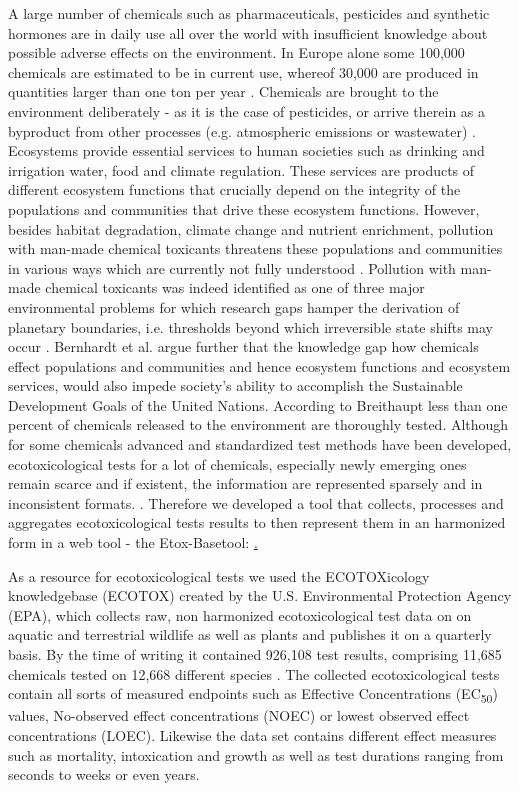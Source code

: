 \documentclass[english]{article}
\newcommand{\etoxbase}{Etox-Base}
\newcommand{\ecfifty}{EC\textsubscript{50}}
\begin{document}
A large number of chemicals such as pharmaceuticals, pesticides and synthetic hormones are in daily use all over the world with insufficient knowledge about possible adverse effects on the environment. In Europe alone some 100,000 chemicals are estimated to be in current use, whereof 30,000 are produced in quantities larger than one ton per year \citep{breithaupt_costs_2006}. Chemicals are brought to the environment deliberately - as it is the case of pesticides, or arrive therein as a byproduct from other processes (e.g. atmospheric emissions or wastewater) \citep{schwarzenbach_challenge_2006}. Ecosystems provide essential services to human societies such as drinking and irrigation water, food and climate regulation. These services are products of different ecosystem functions that crucially depend on the integrity of the populations and communities that drive these ecosystem functions. However, besides habitat degradation, climate change and nutrient enrichment, pollution with man-made chemical toxicants threatens these populations and communities in various ways which are currently not fully understood \citep{steffen_anthropocene_2007}. Pollution with man-made chemical toxicants was indeed identified as one of three major environmental problems for which research gaps hamper the derivation of planetary boundaries, i.e. thresholds beyond which irreversible state shifts may occur \citep{steffen_anthropocene_2007}. Bernhardt et al. \citet{bernhardt_synthetic_2017} argue further that the knowledge gap how chemicals effect populations and communities and hence ecosystem functions and ecosystem services, would also impede society’s ability to accomplish the Sustainable Development Goals of the United Nations. According to Breithaupt \citet{breithaupt_costs_2006} less than one percent of chemicals released to the environment are thoroughly tested. Although for some chemicals advanced and standardized \citep{oecd_oecd_2018} test methods have been developed, ecotoxicological tests for a lot of chemicals, especially newly emerging ones remain scarce and if existent, the information are represented sparsely and in inconsistent formats. \citep{gessner_fostering_2016}. Therefore we developed a tool that collects, processes and aggregates ecotoxicological tests results to then represent them in an harmonized form in a web tool - the \etoxbase tool: \href{http://139.14.20.252:3838/etox-base-shiny/}. 

As a resource for ecotoxicological tests we used the ECOTOXicology knowledgebase (ECOTOX) created by the U.S. Environmental Protection Agency (EPA), which collects raw, non harmonized ecotoxicological test data on on aquatic and terrestrial wildlife as well as plants and publishes it on a quarterly basis. By the time of writing it contained 926,108 test results, comprising 11,685 chemicals tested on 12,668 different species \citep{elonen_ecotoxicology_2018}. The collected ecotoxicological tests contain all sorts of measured endpoints such as Effective Concentrations (\ecfifty{}) values, No-observed effect concentrations (NOEC) or lowest observed effect concentrations (LOEC). Likewise the data set contains different effect measures such as mortality, intoxication and growth as well as test durations ranging from seconds to weeks or even years.
\end{document}
